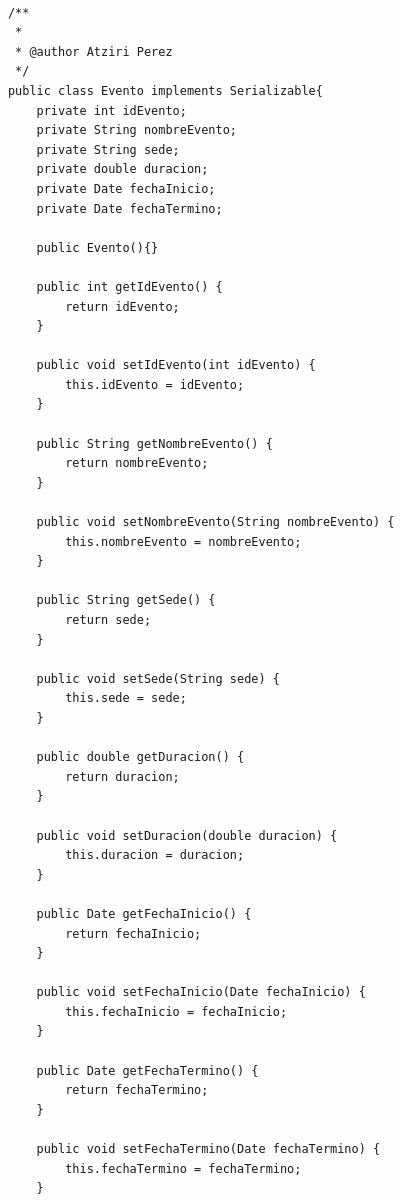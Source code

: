 \documentclass[10pt,a4paper]{article}
\begin{document}
    	\begin{lstlisting}
            
            /**
             *
             * @author Atziri Perez
             */
            public class Evento implements Serializable{
                private int idEvento;
                private String nombreEvento;
                private String sede;
                private double duracion;
                private Date fechaInicio;
                private Date fechaTermino;
                
                public Evento(){}
            
                public int getIdEvento() {
                    return idEvento;
                }
            
                public void setIdEvento(int idEvento) {
                    this.idEvento = idEvento;
                }
            
                public String getNombreEvento() {
                    return nombreEvento;
                }
            
                public void setNombreEvento(String nombreEvento) {
                    this.nombreEvento = nombreEvento;
                }
            
                public String getSede() {
                    return sede;
                }
            
                public void setSede(String sede) {
                    this.sede = sede;
                }
            
                public double getDuracion() {
                    return duracion;
                }
            
                public void setDuracion(double duracion) {
                    this.duracion = duracion;
                }
            
                public Date getFechaInicio() {
                    return fechaInicio;
                }
            
                public void setFechaInicio(Date fechaInicio) {
                    this.fechaInicio = fechaInicio;
                }
            
                public Date getFechaTermino() {
                    return fechaTermino;
                }
            
                public void setFechaTermino(Date fechaTermino) {
                    this.fechaTermino = fechaTermino;
                }
            

\end{lstlisting}
\end{document}
